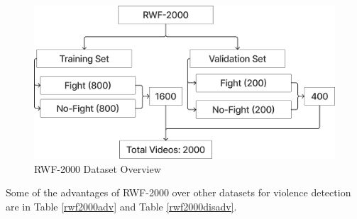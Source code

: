 \begin{enumerate}

    \begin{figure}[h!]
        \centering
        \includegraphics[width=0.9\linewidth]{Images/RWF_Dataset.png}
        \caption{RWF-2000 Dataset Overview}
        \label{rwf2000overview}
    \end{figure}


    Some of the advantages of RWF-2000 over other datasets for violence detection are in Table \ref{rwf2000adv} and Table \ref{rwf2000disadv}.
    


\end{enumerate}
